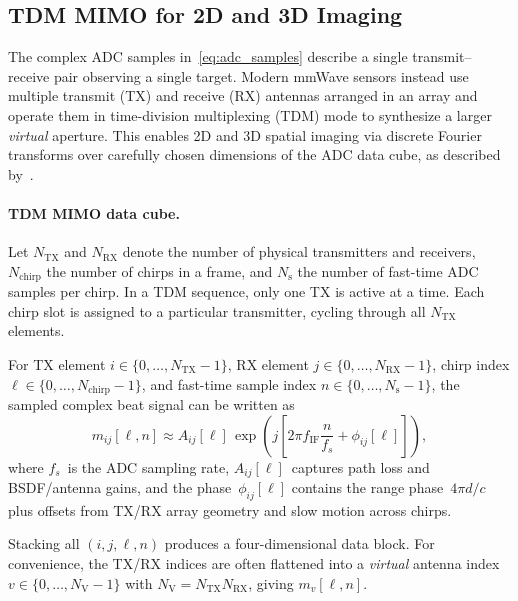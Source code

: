 \subsection{TDM MIMO for 2D and 3D Imaging}
\label{sec:tdm_mimo_imaging}

The complex ADC samples in~\eqref{eq:adc_samples} describe a single transmit--receive pair observing a single target. Modern mmWave sensors instead use multiple transmit (TX) and receive (RX) antennas arranged in an array and operate them in time-division multiplexing (TDM) mode to synthesize a larger \emph{virtual} aperture. This enables 2D and 3D spatial imaging via discrete Fourier transforms over carefully chosen dimensions of the ADC data cube, as described by~\cite{9658500}.

\paragraph{TDM MIMO data cube.}
Let $N_\text{TX}$ and $N_\text{RX}$ denote the number of physical transmitters and receivers, $N_\text{chirp}$ the number of chirps in a frame, and $N_\text{s}$ the number of fast-time ADC samples per chirp. In a TDM sequence, only one TX is active at a time. Each chirp slot is assigned to a particular transmitter, cycling through all $N_\text{TX}$ elements.

For TX element $i \in \{0,\dots,N_\text{TX}-1\}$, RX element $j \in \{0,\dots,N_\text{RX}-1\}$, chirp index $\ell \in \{0,\dots,N_\text{chirp}-1\}$, and fast-time sample index $n \in \{0,\dots,N_\text{s}-1\}$, the sampled complex beat signal can be written as
\begin{equation}
    m_{ij}[\ell,n] \approx A_{ij}[\ell]\,
    \exp\!\left(
        j\left[
            2\pi f_{\mathrm{IF}} \frac{n}{f_s}
            + \phi_{ij}[\ell]
        \right]
    \right),
    \label{eq:tdm_mimo_sample}
\end{equation}
where $f_s$~is the ADC sampling rate, $A_{ij}[\ell]$~captures path loss and BSDF/antenna gains, and the phase~$\phi_{ij}[\ell]$ contains the range phase~$4\pi d/c$ plus offsets from TX/RX array geometry and slow motion across chirps.

Stacking all $(i,j,\ell,n)$ produces a four-dimensional data block. For convenience, the TX/RX indices are often flattened into a \emph{virtual} antenna index $v \in \{0,\dots,N_\text{V}-1\}$ with $N_\text{V} = N_\text{TX} N_\text{RX}$, giving $m_v[\ell,n]$.


